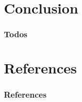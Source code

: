 \documentclass[
	aspectratio=169,
	compress,
]{beamer}
\newcommand{\navframetitle}[1]{\frametitle{#1\hfill{\footnotesize\lastsection{}}}}
\begin{document}
\section{Conclusion}
\label{sec:conclusion}

\begin{frame}
	\navframetitle{Todos}


	\lipsum[1]
\end{frame}

\appendix

\AtBeginSection{}
\AtBeginSubsection{}

\section{References}

\begin{frame}[allowframebreaks]
	\frametitle{References}

	
	
\end{frame}
\end{document}
